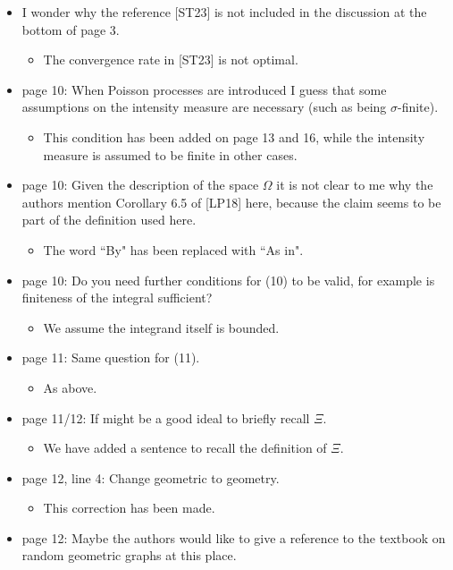 \documentclass[11pt]{article}
\begin{document}
\begin{itemize}
      \item I wonder why the reference [ST23] is not included in the discussion at the bottom of page 3.
\begin{itemize}
\item The convergence rate in [ST23] is not optimal. 
\end{itemize}      
  \item  page 10: When Poisson processes are introduced I guess that some assumptions on the intensity measure are necessary (such as being $\sigma$-finite).
  \begin{itemize}
  \item This condition has been added on page 13 and 16, while the intensity measure is assumed
to be finite in other cases.
  \end{itemize}
  \item  page 10: Given the description of the space $\Omega$ it is not clear to me why the authors mention Corollary 6.5 of [LP18] here, because the claim seems to be part of the definition used here.
    \begin{itemize}
  \item The word ``By" has been replaced with ``As in".
  \end{itemize}
  \item  page 10: Do you need further conditions for (10) to be valid, for example is finiteness of the integral sufficient?
  \begin{itemize}
  \item We assume the integrand itself is bounded. 
  \end{itemize}
  \item  page 11: Same question for (11).
  \begin{itemize}
  \item As above. 
  \end{itemize}
  \item  page 11/12: If might be a good ideal to briefly recall $\Xi$.
  \begin{itemize}
  \item We have added a sentence to recall the definition of $\Xi$.
  \end{itemize}
  \item  page 12, line 4: Change geometric to geometry.
  \begin{itemize}
    \item This correction has been made.
  \end{itemize}
  \item  page 12: Maybe the authors would like to give a reference to the textbook on random geometric graphs at this place.

\end{itemize}
\end{document}
